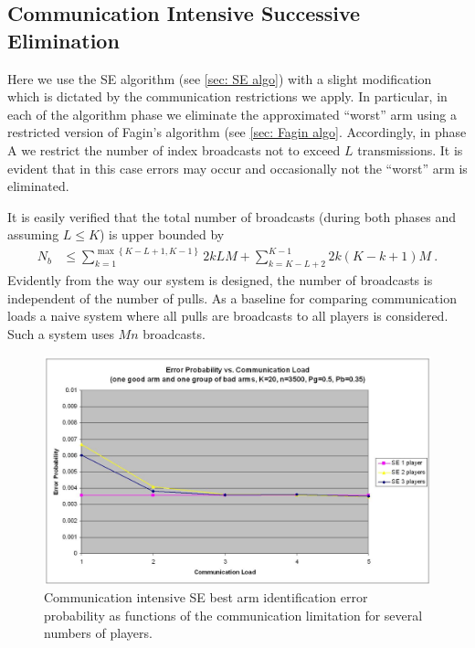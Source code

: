 \documentclass{sig-alternate}
\newcommand{\set}[1]{\left\{#1\right\}}
\newcommand{\comment}[1]{}
\begin{document}
\comment{Experimenting with a different flavour of the algorithm appling a full Fagin algorithm instead of a single fagin step presents similar results, with a neglegable reduction of the error probability when running with more than one player.}

\subsection{Communication Intensive Successive Elimination}

Here we use the SE algorithm (see \ref{sec: SE algo}) with a slight modification which is dictated by the communication restrictions we apply. In particular, in each of the algorithm phase we eliminate the approximated ``worst'' arm using a restricted version of Fagin's algorithm (see \ref{sec: Fagin algo}. Accordingly, in phase A we restrict the number of index broadcasts not to exceed $L$ transmissions. It is evident that in this case errors may occur and occasionally not the ``worst'' arm is eliminated.

It is easily verified that the total number of broadcasts (during both phases and assuming $L\le K$) is upper bounded by
\begin{equation}
\begin{aligned}
N_b & \le \sum_{k=1}^{\max\set{K-L+1,K-1}} 2 k L M+  
\sum_{k=K-L+2}^{K-1} 2 k (K-k+1)M\ .
\end{aligned}
\end{equation}
Evidently from the way our system is designed, the number of broadcasts is independent of the number of pulls. As a baseline for comparing communication loads a naive system where all pulls are broadcasts to all players is considered. Such a system uses $Mn$ broadcasts.

\begin{figure}[t]
\centering
\includegraphics[scale=0.4]{figures/Error_Prob.jpg}
\caption{Communication intensive SE best arm identification error probability as functions of the communication limitation for several numbers of players.}
\label{fig: error}
\end{figure}
\end{document}
